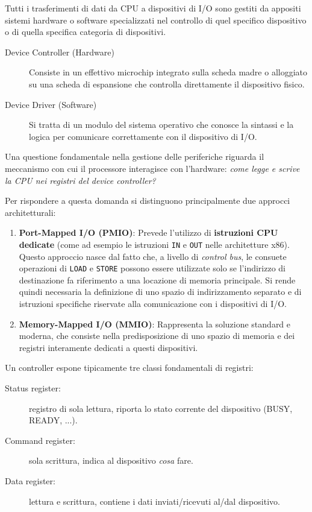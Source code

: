 \documentclass[12pt]{report}
\begin{document}
	Tutti i trasferimenti di dati da CPU a dispositivi di I/O sono gestiti da appositi sistemi hardware o software specializzati nel controllo di quel specifico dispositivo o di quella specifica categoria di dispositivi.
	
	\begin{description}
		\item[Device Controller (Hardware)] 
		Consiste in un effettivo microchip integrato sulla scheda madre o alloggiato su una scheda di espansione che controlla direttamente il dispositivo fisico.
		
		\item[Device Driver (Software)] 
		Si tratta di un modulo del sistema operativo che conosce la sintassi e la logica per comunicare correttamente con il dispositivo di I/O.
		
	\end{description}
	
	Una questione fondamentale nella gestione delle periferiche riguarda il meccanismo con cui il processore interagisce con l'hardware: \textit{come legge e scrive la CPU nei registri del device controller?}
	
	Per rispondere a questa domanda si distinguono principalmente due approcci architetturali:
	
	\begin{enumerate}
		\item \textbf{Port-Mapped I/O (PMIO)}:
		Prevede l'utilizzo di \textbf{istruzioni CPU dedicate} (come ad esempio le istruzioni \texttt{IN} e \texttt{OUT} nelle architetture x86). Questo approccio nasce dal fatto che, a livello di \textit{control bus}, le consuete operazioni di \texttt{LOAD} e \texttt{STORE} possono essere utilizzate solo se l'indirizzo di destinazione fa riferimento a una locazione di memoria principale. Si rende quindi necessaria la definizione di uno spazio di indirizzamento separato e di istruzioni specifiche riservate alla comunicazione con i dispositivi di I/O.
		
		\item \textbf{Memory-Mapped I/O (MMIO)}:
		Rappresenta la soluzione standard e moderna, che consiste nella predisposizione di uno spazio di memoria e dei registri interamente dedicati a questi dispositivi.
	\end{enumerate}
	
	Un controller espone tipicamente tre classi fondamentali di registri:
	\begin{description}
		\item [Status register:] registro di sola lettura, riporta lo stato corrente del dispositivo (BUSY, READY, ...).
		
		\item [Command register:] sola scrittura, indica al dispositivo \textit{cosa} fare.
		
		\item [Data register:] lettura e scrittura, contiene i dati inviati/ricevuti al/dal dispositivo.
	\end{description}
	
\end{document}
